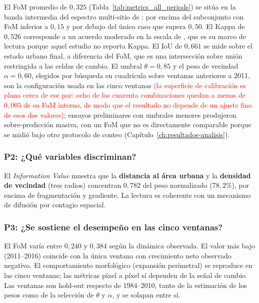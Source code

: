 El FoM promedio de $0{,}325$ (Tabla~\ref{tab:metrics_all_periods}) se sitúa en la banda intermedia del espectro multi-sitio de \textcite{pontius2008comparing}: por encima del subconjunto con FoM inferior a $0{,}15$ y por debajo del único caso que supera $0{,}50$. El Kappa de $0{,}526$ corresponde a un acuerdo moderado en la escala de \textcite{LandisKoch1977}, que es su marco de lectura porque aquel estudio no reporta Kappa. El IoU de $0{,}661$ se mide sobre el estado urbano final, a diferencia del FoM, que es una intersección sobre unión restringida a las celdas de cambio. El umbral $\theta = 0{,}85$ y el peso de vecindad $\alpha = 0{,}60$, elegidos por búsqueda en cuadrícula sobre ventanas anteriores a 2011, son la configuración usada en las cinco ventanas\textcolor{red}{ (la superficie de calibración es plana cerca de ese par: ocho de las cuarenta combinaciones quedan a menos de $0{,}005$ de su FoM interno, de modo que el resultado no depende de un ajuste fino de esos dos valores)}; ensayos preliminares con umbrales menores produjeron sobre-predicción masiva, con un FoM que no es directamente comparable porque se midió bajo otro protocolo de conteo (Capítulo~\ref{ch:resultados-analisis}).

\subsubsection{P2: ¿Qué variables discriminan?}

El \textit{Information Value} muestra que la \textbf{distancia al área urbana} y la \textbf{densidad de vecindad} (tres radios) concentran $0{,}782$ del peso normalizado ($78{,}2$\%), por encima de fragmentación y gradiente. La lectura es coherente con un mecanismo de difusión por contagio espacial.

\subsubsection{P3: ¿Se sostiene el desempeño en las cinco ventanas?}

El FoM varía entre $0{,}240$ y $0{,}384$ según la dinámica observada. El valor más bajo (2011--2016) coincide con la única ventana con crecimiento neto observado negativo. El comportamiento morfológico (expansión perimetral) se reproduce en las cinco ventanas; las métricas píxel a píxel sí dependen de la señal de cambio. Las ventanas son hold-out respecto de 1984--2010, tanto de la estimación de los pesos como de la selección de $\theta$ y $\alpha$, y se solapan entre sí.

